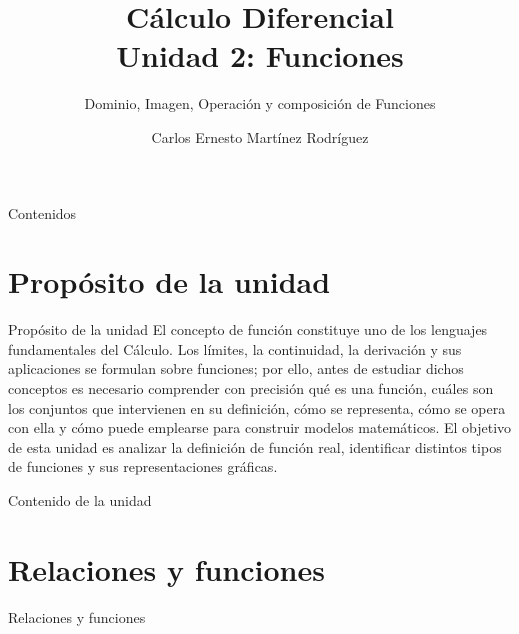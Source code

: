 \documentclass[aspectratio=169,10pt]{beamer}
\title{Cálculo Diferencial\\Unidad 2: Funciones}
\subtitle{Dominio, Imagen, Operación y composición de Funciones}
\author{Carlos Ernesto Martínez Rodríguez}
\institute{Tecnológico Nacional de México}
\date{}
\begin{document}

\begin{frame}{Contenidos}
\tableofcontents
\end{frame}
\section*{Propósito de la unidad}
\begin{frame}{Propósito de la unidad}
El concepto de función constituye uno de los lenguajes fundamentales del Cálculo. Los límites, la continuidad, la derivación y sus aplicaciones se formulan sobre funciones; por ello, antes de estudiar dichos conceptos es necesario comprender con precisión qué es una función, cuáles son los conjuntos que intervienen en su definición, cómo se representa, cómo se opera con ella y cómo puede emplearse para construir modelos matemáticos. El objetivo de esta unidad es analizar la definición de función real, identificar distintos tipos de funciones y sus representaciones gráficas.

\end{frame}

\begin{frame}{Contenido de la unidad}
    \tableofcontents
\end{frame}
\section{Relaciones y funciones}
\begin{frame}{Relaciones y funciones}



\end{frame}
\end{document}
